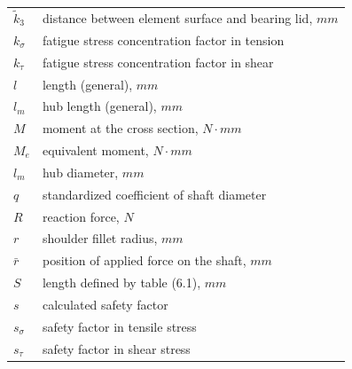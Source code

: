 \begin{tabular}[t]{p{}p{}}
	$ \tilde{k}_3 $ & distance between element surface and bearing lid, $ \unit{mm} $\\
	$ k_\sigma $ & fatigue stress concentration factor in tension\\
	$ k_\tau $ & fatigue stress concentration factor in shear\\
	$ l $ & length (general), $ \unit{mm} $\\
	$ l_m $ & hub length (general), $ \unit{mm} $\\
	$ M $ & moment at the cross section, $ \unit{N\cdot mm} $\\
	$ M_e $ & equivalent moment, $ \unit{N\cdot mm} $\\
	$ l_m $ & hub diameter, $ \unit{mm} $\\
	$ q $ & standardized coefficient of shaft diameter\\
	$ R $ & reaction force, $ \unit{N} $\\
	$ r $ & shoulder fillet radius, $ \unit{mm} $\\
	$ \bar{r} $ & position of applied force on the shaft, $\unit{mm}$\\
	$ S $ & length defined by table (6.1), $ \unit{mm} $\\
	$ s $ & calculated safety factor\\
	$ s_\sigma $ & safety factor in tensile stress\\
	$ s_\tau $ & safety factor in shear stress\\
\end{tabular}
